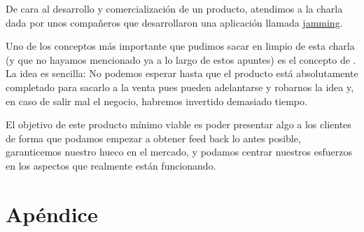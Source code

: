 \documentclass[nochap,palatino,shortheader]{apuntes}
\begin{document}
De cara al desarrollo y comercialización de un producto, atendimos a la charla dada por unos compañeros que desarrollaron una aplicación llamada \href{buscarurl}{jamming}.

Uno de los conceptos más importante que pudimos sacar en limpio de esta charla (y que no hayamos mencionado ya a lo largo de estos apuntes) es el concepto de . La idea es sencilla: No podemos esperar hasta que el producto está absolutamente completado para sacarlo a la venta pues pueden adelantarse y robarnos la idea y, en caso de salir mal el negocio, habremos invertido demasiado tiempo.

El objetivo de este producto mínimo viable es poder presentar algo a los clientes de forma que podamos empezar a obtener feed back lo antes posible, garanticemos nuestro hueco en el mercado, y podamos centrar nuestros esfuerzos en los aspectos que realmente están funcionando.


\newpage
\section{Apéndice}

\label{sec:CreacionEmpresa}

\label{sec:cicloExplotacion}

\label{sec:contabilidad}

\label{sec:circuitoContableIntegrado}

\label{sec:Fruteria}

\label{sec:Prestamos}

\label{sec:ProyectoInversion}

\printindex
\end{document}
